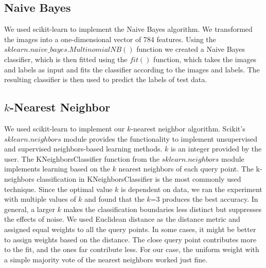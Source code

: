 

\subsection{Naive Bayes}
We used scikit-learn to implement the Naive Bayes algorithm. We transformed the images into a one-dimensional vector of 784 features. 
Using the $sklearn.naive\_bayes.MultinomialNB()$ function we created a Naive Bayes classifier, which is then fitted using the $fit()$ function, which takes the images and labels as input and fits the classifier according to the images and labels. The resulting classifier is then used to predict the labels of test data.

\subsection{$k$-Nearest Neighbor}
 We used scikit-learn to implement our $k$-nearest neighbor algorithm. Scikit's $sklearn.neighbors$ module provides the functionality to implement unsupervised and supervised neighbors-based learning methods. $k$ is an integer provided by the user.
 The KNeighborsClassifier function from the $sklearn.neighbors$ module implements learning based on the $k$ nearest neighbors of each query point. The k-neighbors classification in KNeighborsClassifier is the most commonly used technique. Since the optimal value $k$ is dependent on data, we ran the experiment with multiple values of $k$ and found that the $k$=3 produces the best accuracy. In general, a larger $k$ makes the classification boundaries less distinct but suppresses the effects of noise.
 We used Euclidean distance as the distance metric and assigned equal weights to all the query points. In some cases, it might be better to assign weights based on the distance. The close query point contributes more to the fit, and the ones far contribute less. For our case, the uniform weight with a simple majority vote of the nearest neighbors worked just fine.

